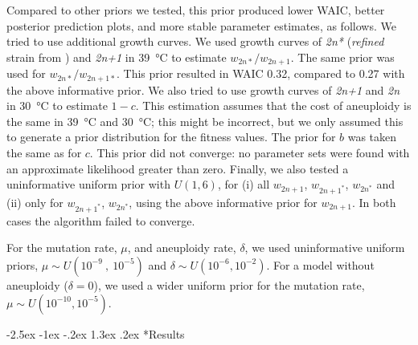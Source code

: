 \documentclass[12pt]{extarticle}
\makeatletter
\renewcommand\section{\@startsection {section}{1}{\z@}%
     {-2.5ex \@plus -1ex \@minus -.2ex}%
     {1.3ex \@plus.2ex}%
    {\Large\bfseries}}
\newcommand{\euwt}{\emph{2n}}
\newcommand{\anwt}{\emph{2n+1}}
\newcommand{\eumt}{\emph{2n*}}
\makeatother
\begin{document}
Compared to other priors we tested, this prior produced lower WAIC, better posterior prediction plots, and more stable parameter estimates, as follows.
We tried to use additional growth curves. We used growth curves of \eumt\; (\emph{refined} strain from \citet{Yona2012}) and \anwt\; in \SI{39}{\celsius} to estimate $w_{2n*}/w_{2n+1}$. The same prior was used for $w_{2n*}/w_{2n+1*}$. This prior resulted in WAIC 0.32, compared to 0.27 with the above informative prior.
We also tried to use growth curves of \anwt\; and \euwt\; in \SI{30}{\celsius} to estimate $1-c$. This estimation assumes that the cost of aneuploidy is the same in \SI{39}{\celsius} and \SI{30}{\celsius}; this might be incorrect, but we only assumed this to generate a prior distribution for the fitness values. The prior for $b$ was taken the same as for $c$. This prior did not converge: no parameter sets were found with an approximate likelihood greater than zero.
Finally, we also tested a uninformative uniform prior with $\mathit{U}(1,6)$, for (i) all $w_{2n+1}$, $w_{2n+1^*}$, $w_{2n^*}$ and (ii) only for $w_{2n+1^*}$, $w_{2n^*}$, using the above informative prior for $w_{2n+1}$. In both cases the algorithm failed to converge.
 
For the mutation rate, $\mu$, and aneuploidy rate, $\delta$, we used uninformative uniform priors, $\mu \sim \mathit{U}(10^{-9}\ ,\ 10^{-5})$ and $\delta \sim \mathit{U}(10^{-6} , 10^{-2})$.
For a model without aneuploidy ($\delta=0$), we used a wider uniform prior for the mutation rate, $\mu \sim \mathit{U}(10^{-10},10^{-5})$. 

\section*{Results}
\end{document}

